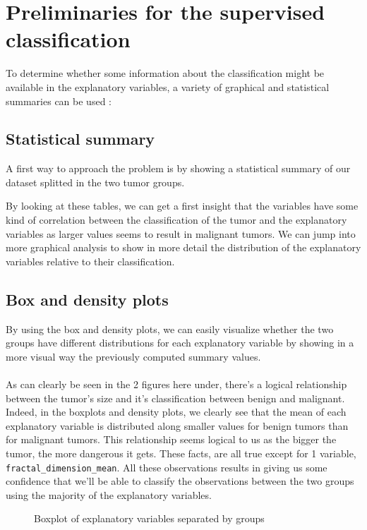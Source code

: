 \section{Preliminaries for the supervised classification}

To determine whether some information about the classification might be available in the explanatory variables, a variety of graphical and statistical summaries can be used : 

\subsection{Statistical summary}
A first way to approach the problem is by showing a statistical summary of our dataset splitted in the two tumor groups.




By looking at these tables, we can get a first insight that the variables have some kind of correlation between the classification of the tumor and the explanatory variables as larger values seems to result in malignant tumors. We can jump into more graphical analysis to show in more detail the distribution of the explanatory variables relative to their classification.

\subsection{Box and density plots}
By using the box and density plots, we can easily visualize whether the two groups have different distributions for each explanatory variable by showing in a more visual way the previously computed summary values.
\\\\
As can clearly be seen in the 2 figures here under, there's a logical relationship between the tumor's size and it's classification between benign and malignant. Indeed, in the boxplots and density plots, we clearly see that the mean of each explanatory variable is distributed along smaller values for benign tumors than for malignant tumors. This relationship seems logical to us as the bigger the tumor, the more dangerous it gets. These facts, are all true except for 1 variable, \verb|fractal_dimension_mean|. All these observations results in giving us some confidence that we'll be able to classify the observations between the two groups using the majority of the explanatory variables.

\begin{figure}[H]
    \centering
    
    \caption{Boxplot of explanatory variables separated by groups}
    \label{fig:q1_boxplot}
\end{figure}


